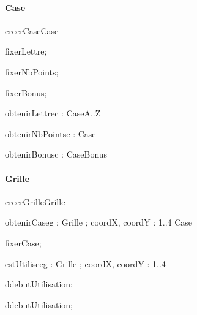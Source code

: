 \paragraph{Case}
\begin{algorithme}
  \signaturefonction
  {creerCase}{}{Case}

  \signatureprocedure
  {fixerLettre}{; }

  \signatureprocedure
  {fixerNbPoints}{; }

  \signatureprocedure
  {fixerBonus}{; }

  \signaturefonction
  {obtenirLettre}{c : Case}{A..Z}

  \signaturefonction
  {obtenirNbPoints}{c : Case}{\naturelNonNul}

  \signaturefonction
  {obtenirBonus}{c : Case}{Bonus}
\end{algorithme}

\paragraph{Grille}
\begin{algorithme}
  \signaturefonction
  {creerGrille}{}{Grille}

  \signaturefonction
  {obtenirCase}{g : Grille ; coordX, coordY : 1..4 }{Case}

  \signatureprocedure
  {fixerCase}{; }

  \signaturefonction
  {estUtilisee}{g : Grille ; coordX, coordY : 1..4}{\booleen}

  \signatureprocedure
  {ddebutUtilisation}{; }

  \signatureprocedure
  {ddebutUtilisation}{; }

\end{algorithme}
